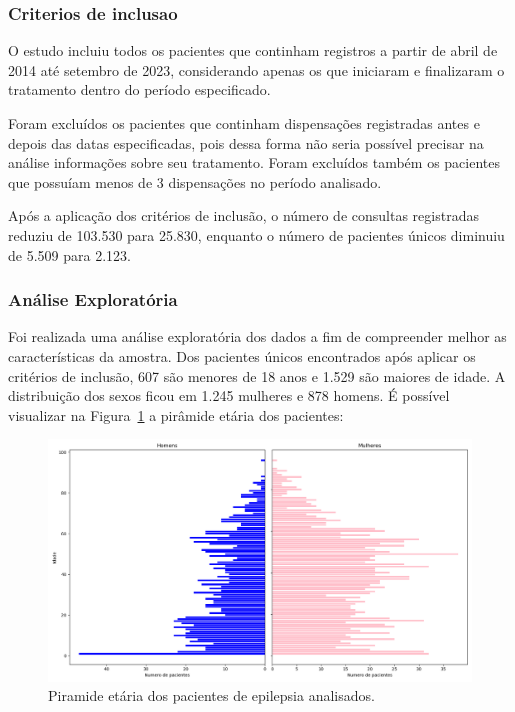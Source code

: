\documentclass[article,a4paper,12pt,brazil,sumario=tradicional]{abntex2}
\begin{document}
\subsubsection{Criterios de inclusao}

O estudo incluiu todos os pacientes que continham registros a partir de abril de 2014 até setembro de 2023, considerando apenas os que iniciaram e finalizaram o tratamento dentro do período especificado.

Foram excluídos os pacientes que continham dispensações registradas antes e depois das datas especificadas, pois dessa forma não seria possível precisar na análise informações sobre seu tratamento. Foram excluídos também os pacientes que possuíam menos de 3 dispensações no período analisado.

Após a aplicação dos critérios de inclusão, o número de consultas registradas reduziu de 103.530 para 25.830, enquanto o número de pacientes únicos diminuiu de 5.509 para 2.123.

\subsubsection{Análise Exploratória}

Foi realizada uma análise exploratória dos dados a fim de compreender melhor as características da amostra. Dos pacientes únicos encontrados após aplicar os critérios de inclusão, 607 são menores de 18 anos e 1.529 são maiores de idade. A distribuição dos sexos ficou em 1.245 mulheres e 878 homens. É possível visualizar na Figura~\ref{fig:piramide_etaria_completa} a pirâmide etária dos pacientes:

\begin{figure}[ht!]
    \centering
    \includegraphics[width=1\textwidth]{piramide_etaria_completa.png}
    \caption{Piramide etária dos pacientes de epilepsia analisados.}
    \label{fig:piramide_etaria_completa}
\end{figure}
\end{document}

